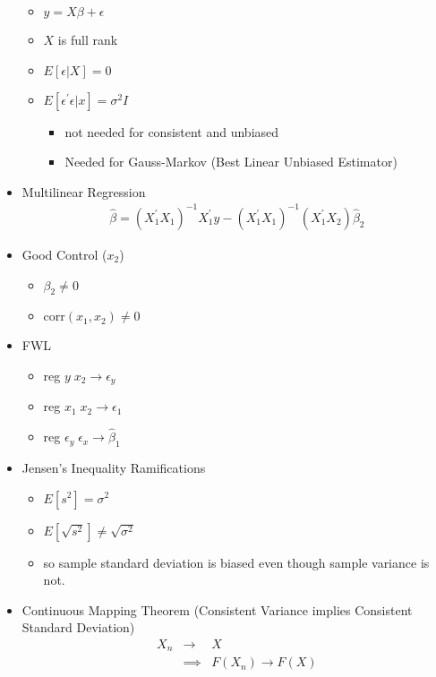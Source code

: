 \documentclass[11pt]{SelfArxOneColBMN}
\begin{document}
\begin{itemize}
  \begin{itemize}
    \item $y = X\beta + \epsilon$
    \item $X$ is full rank
    \item $E[\epsilon|X] = 0$
    \item $E[\epsilon^\prime\epsilon|x] = \sigma^2 I$
    \begin{itemize}
      \item not needed for consistent and unbiased
      \item Needed for Gauss-Markov (Best Linear Unbiased Estimator)
    \end{itemize}
  \end{itemize}
  \item Multilinear Regression
  \begin{eqnarray*}
    \hat{\beta} = (X_1^\prime X_1)^{-1}X_1^\prime y - (X_1^\prime X_1)^{-1}(X_1^\prime X_2)\hat{\beta}_2
  \end{eqnarray*}
  \item Good Control ($x_2$)
  \begin{itemize}
    \item $\beta_2 \neq 0$
    \item $\text{corr}(x_1,x_2) \neq 0$
  \end{itemize}
  \item FWL
  \begin{itemize}
    \item reg $y \; x_2 \rightarrow \epsilon_y$
    \item reg $x_1 \; x_2 \rightarrow \epsilon_1$
    \item reg $\epsilon_y \; \epsilon_x \rightarrow \hat{\beta}_1$
  \end{itemize}
  \item Jensen's Inequality Ramifications
  \begin{itemize}
    \item $E[s^2] = \sigma^2$
    \item $E[\sqrt{s^2}] \neq \sqrt{\sigma^2}$
    \item so sample standard deviation is biased even though sample variance is not.
  \end{itemize}
  \item Continuous Mapping Theorem (Consistent Variance implies Consistent Standard Deviation)
  \begin{eqnarray*}
    X_n &\rightarrow& X\\
    &\implies& F(X_n) \rightarrow F(X)
  \end{eqnarray*}

\end{itemize}
\end{document}
